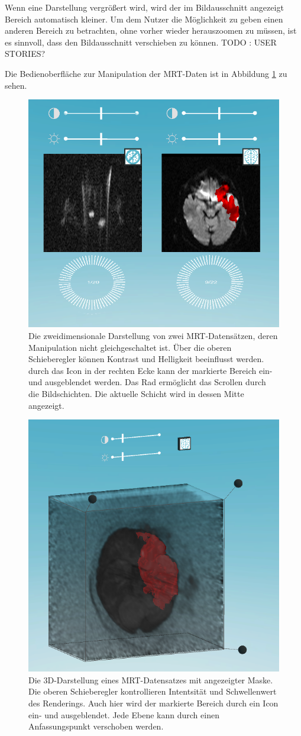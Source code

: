 Wenn eine Darstellung vergrößert wird, wird der im Bildausschnitt angezeigt Bereich automatisch kleiner. Um dem Nutzer die Möglichkeit zu geben einen anderen Bereich zu betrachten, ohne vorher wieder herauszoomen zu müssen, ist es sinnvoll, dass den Bildausschnitt verschieben zu können. 
TODO : USER STORIES?



Die Bedienoberfläche zur Manipulation der MRT-Daten ist in Abbildung \ref{img:mARt2d} zu sehen.

\begin{figure}
	\centering
	\includegraphics[width=0.5\linewidth]{images/mARt2d.png}
	\caption{Die zweidimensionale Darstellung von zwei MRT-Datensätzen, deren Manipulation nicht gleichgeschaltet ist. Über die oberen Schieberegler können Kontrast und Helligkeit beeinflusst werden. durch das Icon in der rechten Ecke kann der markierte Bereich ein- und ausgeblendet werden. Das Rad ermöglicht das Scrollen durch die Bildschichten. Die aktuelle Schicht wird in dessen Mitte angezeigt. }
	\label{img:mARt2d}
\end{figure}


\begin{figure}
	\centering
	\includegraphics[width=0.5\linewidth]{images/mARt3d.png}
	\caption{Die 3D-Darstellung eines MRT-Datensatzes mit angezeigter Maske. Die oberen Schieberegler kontrollieren Intentsität und Schwellenwert des Renderings. Auch hier wird der markierte Bereich durch ein Icon ein- und ausgeblendet. Jede Ebene kann durch einen Anfassungspunkt verschoben werden.}
	\label{img:mARt3d}
\end{figure}



